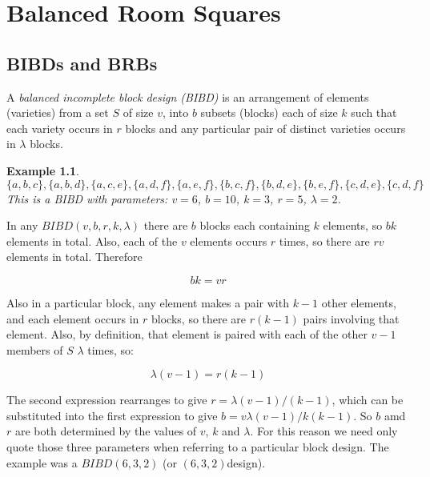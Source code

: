\documentclass[
  11pt,
  a4paper]{book}
\newtheorem{example}{Example}
\begin{document}
\hypertarget{balanced-room-squares}{%
\chapter{Balanced Room Squares}\label{balanced-room-squares}}

\hypertarget{bibds-and-brbs}{%
\section{BIBDs and BRBs}\label{bibds-and-brbs}}

A \emph{balanced incomplete block design (BIBD)} is an
arrangement of elements (varieties) from a set \(S\) of size
\(v\), into \(b\) subsets (blocks) each of size \(k\) such that
each variety occurs in \(r\) blocks and any particular pair of
distinct varieties occurs in \(\lambda\) blocks.

\begin{example}
$$\{a,b,c\},\{a,b,d\},\{a,c,e\},\{a,d,f\},\{a,e,f\},\{b,c,f\},\{b,d,e\},\{b,e,f\},\{c,d,e\},\{c,d,f\}$$
This is a BIBD with parameters: $v = 6$, $b = 10$, $k = 3$,
$r = 5$, $\lambda = 2$.
\end{example}

In any \(BIBD(v, b, r, k, \lambda)\) there are \(b\) blocks each
containing \(k\) elements, so \(bk\) elements in total. Also,
each of the \(v\) elements occurs \(r\) times, so there are \(rv\)
elements in total. Therefore

\begin{equation}
bk = vr
\end{equation}

Also in a
particular block, any element makes a pair with \(k - 1\)
other elements, and each element occurs in \(r\) blocks, so
there are \(r(k - 1)\) pairs involving that element. Also, by
definition, that element is paired with each of the other
\(v - 1\) members of \(S\) \(\lambda\) times, so:

\begin{equation}
\lambda (v - 1) = r(k - 1)
\end{equation}

The second expression rearranges to give
\(r = \lambda (v - 1)/(k - 1)\), which can be substituted
into the first expression to give
\(b = v\lambda (v - 1)/k(k - 1)\). So \(b\) amd \(r\) are
both determined by the values of \(v\), \(k\) and \(\lambda\). For
this reason we need only quote those three parameters when
referring to a particular block design. The example was a
\(BIBD(6, 3, 2)\) (or \((6, 3, 2)\)design).
\end{document}
